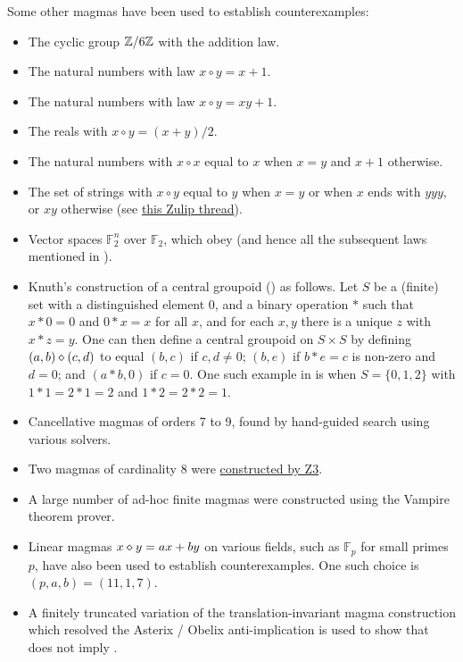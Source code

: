 Some other magmas have been used to establish counterexamples:
\begin{itemize}
  \item The cyclic group $\mathbb{Z}/6\mathbb{Z}$ with the addition law.
  \item The natural numbers with law $x \circ y = x+1$.
  \item The natural numbers with law $x \circ y = xy+1$.
  \item The reals with $x \circ y = (x+y)/2$.
  \item The natural numbers with $x \circ x$ equal to $x$ when $x=y$ and $x+1$ otherwise.
  \item The set of strings with $x \circ y$ equal to $y$ when $x=y$ or when $x$ ends with $yyy$, or $xy$ otherwise (see \href{https://leanprover.zulipchat.com/#narrow/stream/458659-Equational/topic/3102.20does.20not.20imply.203176}{this Zulip thread}).
  \item Vector spaces ${\mathbb F}_2^n$ over ${\mathbb F}_2$, which obey  (and hence all the subsequent laws mentioned in ).
  \item Knuth's construction \cite{knuth} of a central groupoid () as follows.  Let $S$ be a (finite) set with a distinguished element $0$, and a binary operation $*$ such that $x*0=0$ and $0*x=x$   for all $x$, and for each $x,y$ there is a unique $z$ with $x*z=y$.  One can then define a central groupoid on $S \times S$ by defining $(a,b) \diamond (c,d)$ to equal $(b,c)$ if $c,d \neq 0$; $(b,e)$ if $b*e=c$ is non-zero and $d=0$; and $(a*b,0)$ if $c=0$.  One such example in \cite{knuth} is when $S = \{0,1,2\}$ with $1*1=2*1=2$ and $1*2=2*2=1$.
  \item Cancellative magmas of orders 7 to 9, found by hand-guided search using various solvers.
  \item Two magmas of cardinality $8$ were \href{https://leanprover.zulipchat.com/#narrow/stream/458659-Equational/topic/using.20z3}{constructed by Z3}.
  \item A large number of ad-hoc finite magmas were constructed using the Vampire theorem prover.
  \item Linear magmas $x\diamond y = ax+by$ on various fields, such as ${\mathbb F}_p$ for small primes $p$, have also been used to establish counterexamples.  One such choice is $(p,a,b) = (11,1,7)$.
  \item A finitely truncated variation of the translation-invariant magma construction which resolved the Asterix / Obelix anti-implication is used to show that  does not imply .
\end{itemize}

